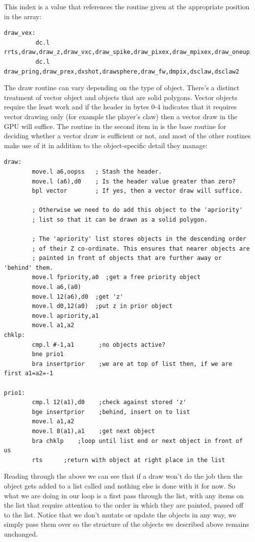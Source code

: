 This index is a value that references the routine given at the appropriate position in the  array:
\begin{lstlisting}
draw_vex: 
         dc.l rrts,draw,draw_z,draw_vxc,draw_spike,draw_pixex,draw_mpixex,draw_oneup,draw_pel,changex
         dc.l draw_pring,draw_prex,dxshot,drawsphere,draw_fw,dmpix,dsclaw,dsclaw2
\end{lstlisting}

The draw routine can vary depending on the type of object. There's a distinct treatment of vector object and objects
that are solid polygons. Vector objects require the least work and if the header in bytes 0-4 indicates that it requires
vector drawing only (for example the player's claw) then a vector draw in the GPU will suffice. The  routine
in the second item in  is the base routine for deciding whether a vector draw is sufficient or not, and
most of the other routines make use of it in addition to the object-specific detail they manage:

\begin{lstlisting}
draw:
        move.l a6,oopss   ; Stash the header.
        move.l (a6),d0    ; Is the header value greater than zero?
        bpl vector        ; If yes, then a vector draw will suffice.

        ; Otherwise we need to do add this object to the 'apriority'
        ; list so that it can be drawn as a solid polygon.

        ; The 'apriority' list stores objects in the descending order
        ; of their Z co-ordinate. This ensures that nearer objects are
        ; painted in front of objects that are further away or 'behind' them.
        move.l fpriority,a0  ;get a free priority object
        move.l a6,(a0)
        move.l 12(a6),d0  ;get 'z'
        move.l d0,12(a0)  ;put z in prior object
        move.l apriority,a1
        move.l a1,a2
chklp:
        cmp.l #-1,a1       ;no objects active?
        bne prio1
        bra insertprior    ;we are at top of list then, if we are first a1=a2=-1

prio1:
        cmp.l 12(a1),d0    ;check against stored 'z'
        bge insertprior    ;behind, insert on to list
        move.l a1,a2
        move.l 8(a1),a1    ;get next object
        bra chklp    ;loop until list end or next object in front of us
        rts      ;return with object at right place in the list
\end{lstlisting}

Reading through the above we can see that if a  draw won't do the job then the object gets
added to a list called  and nothing else is done with it for now. So what we are doing in our
 loop is a first pass through the  list, with any items on the list that 
require attention to the order in which they are painted, passed off to the  list. Notice
that we don't mutate or update the objects in any way, we simply pass them over so the structure of the objects
we described above remains unchanged.

